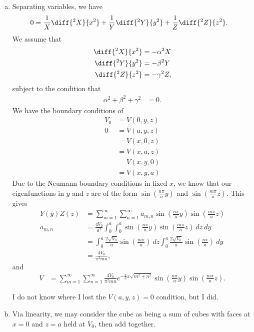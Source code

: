 \documentclass[10pt]{mypackage}
\begin{document}
\begin{solution}[41.13]\hfill
  \begin{enumerate}[(a)]
    \item Separating variables, we have
      \begin{align*}
        0 &= \frac{1}{X}\diff{^2X}{x^2} + \frac{1}{Y}\diff{^2Y}{y^2} + \frac{1}{Z}\diff{^2Z}{z^2}.
      \end{align*}
      We assume that
      \begin{align*}
        \diff{^2 X}{x^2} &= -\alpha^2 X\\
        \diff{^2Y}{y^2} &= -\beta^2 Y\\
        \diff{^2Z}{z^2} &= -\gamma^2 Z,
      \end{align*}
      subject to the condition that
      \begin{align*}
        \alpha^2 + \beta^2 + \gamma^2 &= 0.
      \end{align*}
      We have the boundary conditions of
      \begin{align*}
        V_0 &= V\left( 0,y,z \right)\\
        0 &= V\left( a,y,z \right)\\
          &= V\left( x,0,z \right)\\
          &= V\left( x,a,z \right)\\
          &= V\left( x,y,0 \right)\\
          &= V\left( x,y,a \right)
      \end{align*}
      Due to the Neumann boundary conditions in fixed $x$, we know that our eigenfunctions in $y$ and $z$ are of the form $\sin\left( \frac{n\pi}{a}y \right)$ and $\sin\left( \frac{m\pi}{a}z \right)$. This gives
      \begin{align*}
        Y(y)Z(z) &= \sum_{m=1}^{\infty}\sum_{n=1}^{\infty} a_{m,n}\sin\left( \frac{n\pi}{a}y \right)\sin\left( \frac{m\pi}{a}z \right)\\
        a_{m,n} &= \frac{4V_0}{a^2} \int_{0}^{a} \int_{0}^{a} \sin\left( \frac{n\pi}{a}y \right)\sin\left( \frac{m\pi}{a}z \right)\:dz\:dy\\
                &= \int_{0}^{a} \frac{2\sqrt{V_0}}{a}\sin\left( \frac{m\pi}{a} \right)\:dz \int_{0}^{a} \frac{2\sqrt{V_0}}{a}\sin\left( \frac{n\pi}{a} \right)\:dy\\
                &= \frac{4V_0}{\pi^2 mn},
      \end{align*}
      and
      \begin{align*}
        V &= \sum_{m=1}^{\infty}\sum_{n=1}^{\infty}\frac{4V_0}{\pi^2 mn}e^{-\frac{\pi}{a}x\sqrt{m^2 + n^2}}\sin\left( \frac{n\pi}{a}y \right)\sin\left( \frac{m\pi}{a}z \right).
      \end{align*}
      \begin{remark}
      I do not know where I lost the $V\left( a,y,z \right) = 0$ condition, but I did.
      \end{remark}
    \item Via linearity, we may consider the cube as being a sum of cubes with faces at $x = 0$ and $z = a$ held at $V_0$, then add together.\newline


\end{enumerate}
\end{solution}
\end{document}
